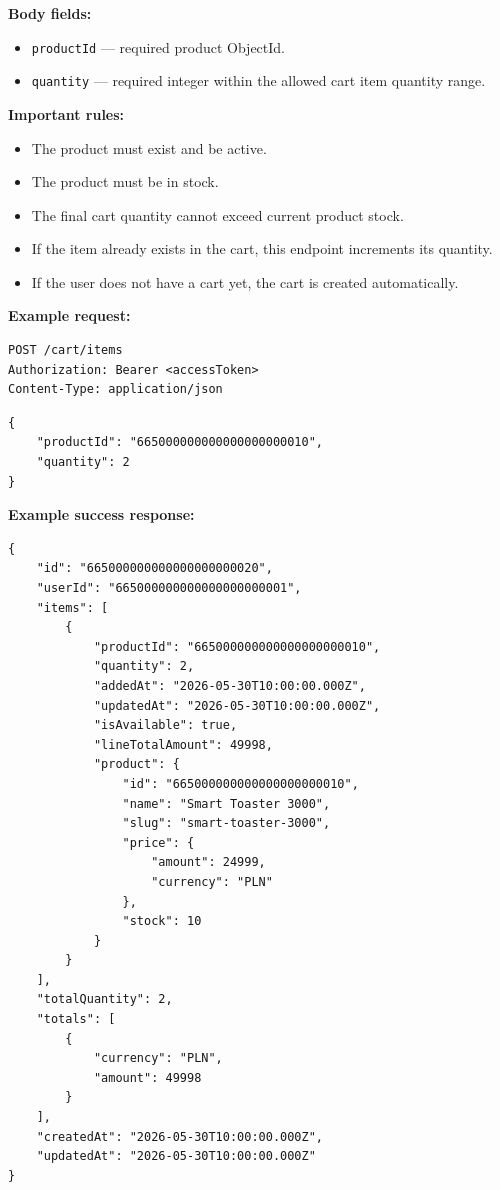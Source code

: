 \textbf{Body fields:}

\begin{itemize}
    \item \texttt{productId} --- required product ObjectId.
    \item \texttt{quantity} --- required integer within the allowed cart item quantity range.
\end{itemize}

\textbf{Important rules:}

\begin{itemize}
    \item The product must exist and be active.
    \item The product must be in stock.
    \item The final cart quantity cannot exceed current product stock.
    \item If the item already exists in the cart, this endpoint increments its quantity.
    \item If the user does not have a cart yet, the cart is created automatically.
\end{itemize}

\textbf{Example request:}

\begin{verbatim}
POST /cart/items
Authorization: Bearer <accessToken>
Content-Type: application/json
\end{verbatim}

\begin{verbatim}
{
    "productId": "665000000000000000000010",
    "quantity": 2
}
\end{verbatim}

\pagebreak
\textbf{Example success response:}

\begin{verbatim}
{
    "id": "665000000000000000000020",
    "userId": "665000000000000000000001",
    "items": [
        {
            "productId": "665000000000000000000010",
            "quantity": 2,
            "addedAt": "2026-05-30T10:00:00.000Z",
            "updatedAt": "2026-05-30T10:00:00.000Z",
            "isAvailable": true,
            "lineTotalAmount": 49998,
            "product": {
                "id": "665000000000000000000010",
                "name": "Smart Toaster 3000",
                "slug": "smart-toaster-3000",
                "price": {
                    "amount": 24999,
                    "currency": "PLN"
                },
                "stock": 10
            }
        }
    ],
    "totalQuantity": 2,
    "totals": [
        {
            "currency": "PLN",
            "amount": 49998
        }
    ],
    "createdAt": "2026-05-30T10:00:00.000Z",
    "updatedAt": "2026-05-30T10:00:00.000Z"
}
\end{verbatim}

